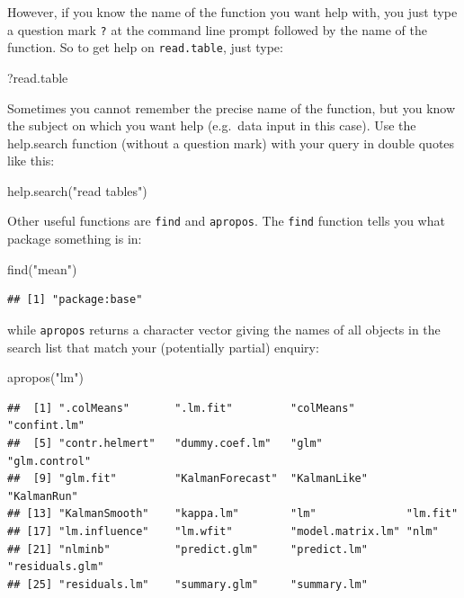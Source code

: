 \documentclass[
]{book}
\newenvironment{Shaded}{\begin{snugshade}}{\end{snugshade}}
\newcommand{\FunctionTok}[1]{\textcolor[rgb]{0.00,0.00,0.00}{#1}}
\newcommand{\NormalTok}[1]{#1}
\newcommand{\StringTok}[1]{\textcolor[rgb]{0.31,0.60,0.02}{#1}}
\begin{document}
However, if you know the name of the function you want help with, you just type a question mark \texttt{?} at the command line prompt followed by the name of the function. So to get help on \texttt{read.table}, just type:

\begin{Shaded}
\begin{Highlighting}[]
\NormalTok{?read.table}
\end{Highlighting}
\end{Shaded}

Sometimes you cannot remember the precise name of the function, but you know the subject on which you want help (e.g.~data input in this case). Use the help.search function (without a question mark) with your query in double quotes like this:

\begin{Shaded}
\begin{Highlighting}[]
\FunctionTok{help.search}\NormalTok{(}\StringTok{"read tables"}\NormalTok{)}
\end{Highlighting}
\end{Shaded}

Other useful functions are \texttt{find} and \texttt{apropos}. The \texttt{find} function tells you what package something is in:

\begin{Shaded}
\begin{Highlighting}[]
\FunctionTok{find}\NormalTok{(}\StringTok{"mean"}\NormalTok{)}
\end{Highlighting}
\end{Shaded}

\begin{verbatim}
## [1] "package:base"
\end{verbatim}

while \texttt{apropos} returns a character vector giving the names of all objects in the search list that match your (potentially partial) enquiry:

\begin{Shaded}
\begin{Highlighting}[]
\FunctionTok{apropos}\NormalTok{(}\StringTok{"lm"}\NormalTok{)}
\end{Highlighting}
\end{Shaded}

\begin{verbatim}
##  [1] ".colMeans"       ".lm.fit"         "colMeans"        "confint.lm"     
##  [5] "contr.helmert"   "dummy.coef.lm"   "glm"             "glm.control"    
##  [9] "glm.fit"         "KalmanForecast"  "KalmanLike"      "KalmanRun"      
## [13] "KalmanSmooth"    "kappa.lm"        "lm"              "lm.fit"         
## [17] "lm.influence"    "lm.wfit"         "model.matrix.lm" "nlm"            
## [21] "nlminb"          "predict.glm"     "predict.lm"      "residuals.glm"  
## [25] "residuals.lm"    "summary.glm"     "summary.lm"
\end{verbatim}
\end{document}
